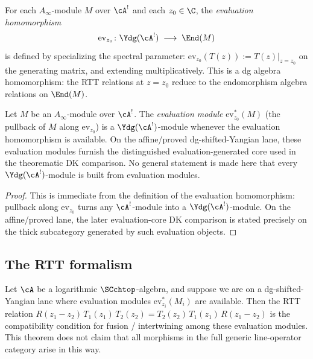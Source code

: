 \begin{definition}
For each $A_\infty$-module $M$ over $\cA^!$ and each
$z_0\in\C$, the \emph{evaluation homomorphism}
\begin{equation}
\mathrm{ev}_{z_0}\colon
\Ydg(\cA^!)
\;\longrightarrow\;
\End(M)
\end{equation}
is defined by specializing the spectral parameter:
$\mathrm{ev}_{z_0}(T(z)):=T(z)\big|_{z=z_0}$
on the generating matrix, and extending multiplicatively.
This is a dg algebra homomorphism: the RTT relations
at $z=z_0$ reduce to the endomorphism algebra relations
on $\End(M)$.
\end{definition}

\begin{proposition}
Let $M$ be an $A_\infty$-module over $\cA^!$. The
\emph{evaluation module} $\mathrm{ev}_{z_0}^*(M)$ (the
pullback of $M$ along $\mathrm{ev}_{z_0}$) is a
$\Ydg(\cA^!)$-module whenever the evaluation homomorphism is
available. On the affine/proved dg-shifted-Yangian lane, these
evaluation modules furnish the distinguished evaluation-generated core
used in the theorematic DK comparison. No general statement is made
here that every $\Ydg(\cA^!)$-module is built from evaluation modules.
\end{proposition}

\begin{proof}
This is immediate from the definition of the evaluation homomorphism:
pullback along $\mathrm{ev}_{z_0}$ turns any $\cA^!$-module into a
$\Ydg(\cA^!)$-module. On the affine/proved lane, the later
evaluation-core DK comparison is stated precisely on the thick
subcategory generated by such evaluation objects.
\end{proof}

\subsection{The RTT formalism}

\begin{theorem}
Let\/ $\cA$ be a logarithmic\/ $\SCchtop$-algebra, and suppose we are on
a dg-shifted-Yangian lane where evaluation modules
$\mathrm{ev}_{z_i}^*(M_i)$ are available. Then the RTT relation
$R(z_1{-}z_2)\,T_1(z_1)\,T_2(z_2)
=T_2(z_2)\,T_1(z_1)\,R(z_1{-}z_2)$
is the compatibility condition for fusion / intertwining among these
evaluation modules. This theorem does not claim that all morphisms in
the full generic line-operator category arise in this way.
\end{theorem}

